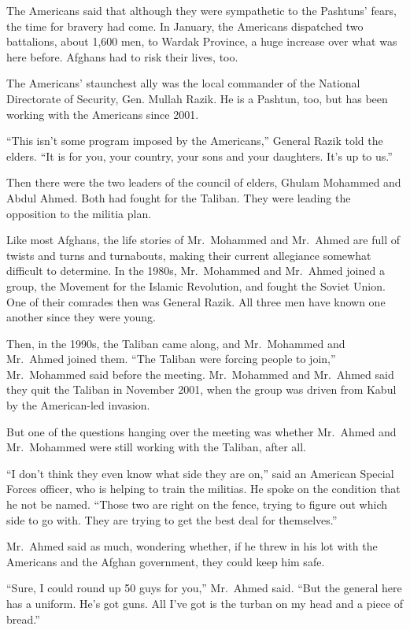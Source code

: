 \documentclass[12pt,a4paper,onecolumn]{article}
\begin{document}
The Americans said that although they were sympathetic to the Pashtuns' fears, the time for bravery
had come. In January, the Americans dispatched two battalions, about 1,600 men, to Wardak Province,
a huge increase over what was here before. Afghans had to risk their lives, too.

The Americans' staunchest ally was the local commander of the National Directorate of Security, Gen.
Mullah Razik. He is a Pashtun, too, but has been working with the Americans since 2001.

``This isn't some program imposed by the Americans,'' General Razik told the elders. ``It is for
you, your country, your sons and your daughters. It's up to us.''

Then there were the two leaders of the council of elders, Ghulam Mohammed and Abdul Ahmed. Both had
fought for the Taliban. They were leading the opposition to the militia plan.

Like most Afghans, the life stories of Mr.~Mohammed and Mr.~Ahmed are full of twists and turns and
turnabouts, making their current allegiance somewhat difficult to determine. In the 1980s,
Mr.~Mohammed and Mr.~Ahmed joined a group, the Movement for the Islamic Revolution, and fought the
Soviet Union. One of their comrades then was General Razik. All three men have known one another
since they were young.

Then, in the 1990s, the Taliban came along, and Mr.~Mohammed and Mr.~Ahmed joined them. ``The
Taliban were forcing people to join,'' Mr.~Mohammed said before the meeting. Mr.~Mohammed and
Mr.~Ahmed said they quit the Taliban in November 2001, when the group was driven from Kabul by the
American-led invasion.

But one of the questions hanging over the meeting was whether Mr.~Ahmed and Mr.~Mohammed were still
working with the Taliban, after all.

``I don't think they even know what side they are on,'' said an American Special Forces officer, who
is helping to train the militias. He spoke on the condition that he not be named. ``Those two are
right on the fence, trying to figure out which side to go with. They are trying to get the best deal
for themselves.''

Mr.~Ahmed said as much, wondering whether, if he threw in his lot with the Americans and the Afghan
government, they could keep him safe.

``Sure, I could round up 50 guys for you,'' Mr.~Ahmed said. ``But the general here has a uniform.
He's got guns. All I've got is the turban on my head and a piece of bread.''
\end{document}
